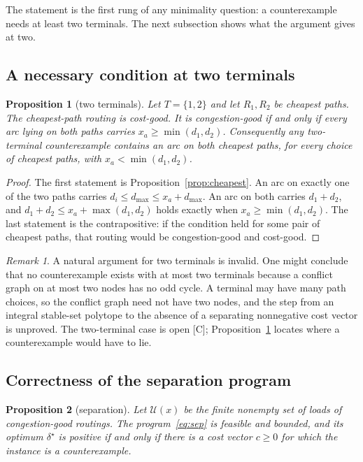 \documentclass[11pt]{article}
\newtheorem{proposition}{Proposition}
\theoremstyle{remark}
\newtheorem{remark}{Remark}
\newcommand{\dmax}{d_{\max}}
\begin{document}
The statement is the first rung of any minimality question: a counterexample needs at least two terminals. The next subsection shows what the argument gives at two.

\subsection{A necessary condition at two terminals}
\label{sec:theory-two}

\begin{proposition}[two terminals]
\label{prop:two}
Let $T=\{1,2\}$ and let $R_1,R_2$ be cheapest paths. The cheapest-path routing is cost-good. It is congestion-good if and only if every arc lying on both paths
carries $x_a\ge\min(d_1,d_2)$. Consequently any two-terminal counterexample contains an arc on both cheapest paths, for every choice of cheapest paths, with
$x_a<\min(d_1,d_2)$.
\end{proposition}

\begin{proof}
The first statement is Proposition~\ref{prop:cheapest}. An arc on exactly one of the two paths carries $d_i\le\dmax\le x_a+\dmax$. An arc on both carries $d_1+d_2$, and
$d_1+d_2\le x_a+\max(d_1,d_2)$ holds exactly when $x_a\ge\min(d_1,d_2)$. The last statement is the contrapositive: if the condition held for some pair of cheapest paths, that
routing would be congestion-good and cost-good.
\end{proof}

\begin{remark}
A natural argument for two terminals is invalid. One might conclude that no counterexample exists with at most two terminals because a conflict graph on at most two nodes
has no odd cycle. A terminal may have many path choices, so the conflict graph need not have two nodes, and the step from an integral stable-set polytope to the absence of a separating
nonnegative cost vector is unproved. The two-terminal case is open [C]; Proposition~\ref{prop:two} locates where a counterexample would have to lie.
\end{remark}

\subsection{Correctness of the separation program}
\label{sec:theory-sep}

\begin{proposition}[separation]
\label{prop:sep}
Let $\mathcal U(x)$ be the finite nonempty set of loads of congestion-good routings. The program~\eqref{eq:sep} is feasible and bounded, and its optimum $\delta^\star$ is positive
if and only if there is a cost vector $c\ge0$ for which the instance is a counterexample.
\end{proposition}
\end{document}
